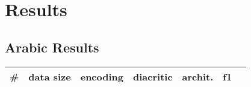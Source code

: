 \section{Results}

\subsection{Arabic Results}
\begin{center}
 \begin{tabular}{c c c c c c c}
     \toprule
     \small{\#                    }& 
     \small{data size    }& 
     \small{encoding     }&
     \small{diacritic    }&
     \small{archit.      }&
     \small{f1           }     \\
     \midrule



\end{tabular}
\end{center}
